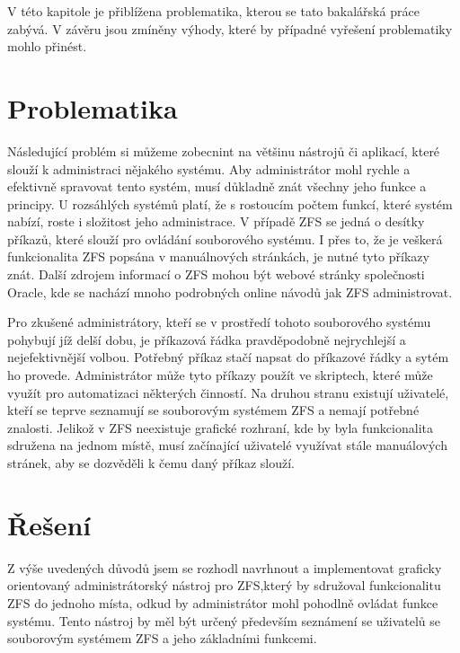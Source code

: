 V této kapitole je přiblížena problematika, kterou se tato bakalářská práce zabývá. V závěru jsou zmíněny výhody, které by případné vyřešení problematiky mohlo přinést.

\section{Problematika}
Následující problém si můžeme zobecnint na většinu nástrojů či aplikací, které slouží k administraci nějakého systému.
Aby administrátor mohl rychle a efektivně spravovat tento systém, musí důkladně znát všechny jeho funkce a principy. U rozsáhlých systémů platí, že s rostoucím počtem funkcí, které systém nabízí, roste i složitost jeho administrace. V případě ZFS se jedná o desítky příkazů, které slouží pro ovládání souborového systému. I přes to, že je veškerá funkcionalita ZFS popsána v manuálnových stránkách, je nutné tyto příkazy znát.
Další zdrojem informací o ZFS mohou být webové stránky společnosti Oracle, kde se nachází mnoho
podrobných online návodů jak ZFS administrovat.

Pro zkušené administrátory, kteří se v prostředí tohoto souborového systému pohybují jíž delší dobu, je příkazová řádka pravděpodobně nejrychlejší a nejefektivnější volbou. Potřebný příkaz stačí napsat do příkazové řádky a sytém ho provede. Administrátor může tyto příkazy použít ve skriptech, které může využít pro automatizaci některých činností. Na druhou stranu existují uživatelé, kteří se teprve seznamují se souborovým systémem ZFS a nemají potřebné znalosti. Jelikož v ZFS neexistuje grafické rozhraní, kde by byla funkcionalita sdružena na jednom místě, musí začínající uživatelé využívat stále manuálových stránek, aby se dozvěděli k čemu daný příkaz slouží.
\section{Řešení}
Z výše uvedených důvodů jsem se rozhodl navrhnout a implementovat graficky orientovaný administrátorský nástroj pro ZFS,který by sdružoval funkcionalitu ZFS do jednoho místa, odkud by administrátor mohl pohodlně ovládat funkce systému. Tento nástroj by měl být určený především seznámení se uživatelů se souborovým systémem ZFS a jeho základními funkcemi.
